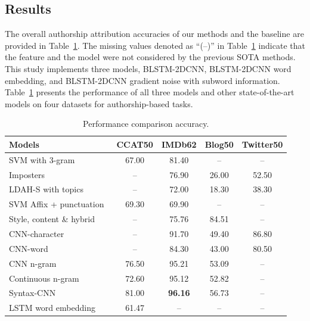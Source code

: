 \documentclass[conference]{IEEEtran}
\begin{document}
\subsection{Results}
The overall authorship attribution accuracies of our methods and the baseline are provided in Table~\ref{table3}. The missing values denoted as ``(--)'' in Table~\ref{table3} indicate that the feature and the model were not considered by the previous SOTA methods. This study implements three models, BLSTM-2DCNN, BLSTM-2DCNN word embedding, and BLSTM-2DCNN gradient noise with subword information. Table~\ref{table3} presents the performance of all three models and other state-of-the-art models on four datasets for authorship-based tasks.
\begin{table}[!t]
\centering
\caption{Performance comparison accuracy.}\label{table3}
\setlength{\tabcolsep}{1pt}
\begin{tabular}{p{4cm}cccc}
\hline
   \textbf{Models} & \textbf{CCAT50}& \textbf{IMDb62}& \textbf{Blog50}& \textbf{Twitter50}\\
\hline
SVM with 3-gram~\cite{plakias2008tensor} & 67.00 & 81.40 & -- & --\\
Imposters~\cite{koppel2011authorship} & -- & 76.90 & 26.00 & 52.50\\
LDAH-S with topics~\cite{seroussi2011authorship} & -- & 72.00 & 18.30 & 38.30\\
SVM Affix + punctuation~\cite{sapkota2015not} & 69.30 & 69.90 & -- & --\\
Style, content \& hybrid~\cite{sari2018topic} & -- & 75.76 & 84.51 & --\\
\hline
CNN-character~\cite{ruder2016character} & -- & 91.70 & 49.40 & 86.80\\
CNN-word~\cite{ruder2016character} & -- & 84.30 & 43.00 & 80.50\\
CNN n-gram~\cite{shrestha2017convolutional} & 76.50 & 95.21 & 53.09 & --\\
Continuous n-gram~\cite{sari2017continuous} & 72.60 & 95.12 & 52.82 & --\\
Syntax-CNN~\cite{zhang2018syntax} & 81.00 & \textbf{96.16} & 56.73 & --\\
\hline
LSTM word embedding~\cite{gupta2017study}  & 61.47 & -- & -- & --\\

\end{tabular}
\end{table}
\end{document}
